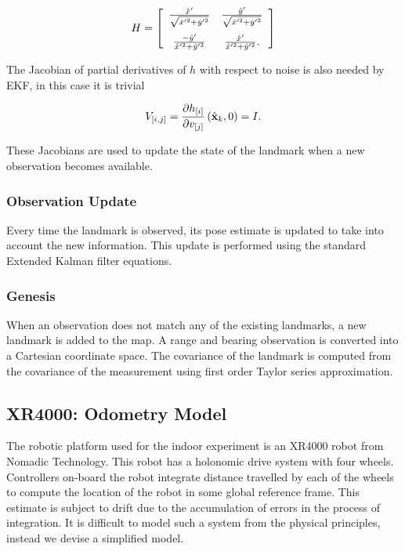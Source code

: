 $$
H = 
 \left[ \begin {array}{cc}
   \frac{\hat{x}'}{ \sqrt{\hat{x}'^2+\hat{y}'^2} } & 
   \frac{\hat{y}'}{ \sqrt{\hat{x}'^2+\hat{y}'^2} } \\ \noalign{\medskip}
   \frac{-\hat{y}'}{ \hat{x}'^2+\hat{y}'^2 } & 
   \frac{ \hat{x}'}{ \hat{x}'^2+\hat{y}'^2 }.
\end{array} \right] 
$$

The Jacobian of partial derivatives of $h$ with respect
to noise is also needed by EKF, in this case it is trivial

$$
V_{[i,j]} = \frac{\partial h_{[i]}}{\partial v_{[j]}}
             \left(\hat{\bf x}_k , 0 \right) = I.
$$

These Jacobians are used to update the state of the landmark when a
new observation becomes available.


\subsubsection{Observation Update}

Every time the landmark is observed, its pose estimate is updated to
take into account the new information. This update is performed using
the standard Extended Kalman filter equations.


\subsubsection{Genesis}

When an observation does not match any of the existing landmarks, a
new landmark is added to the map. A range and bearing observation is
converted into a Cartesian coordinate space. The covariance of the
landmark is computed from the covariance of the measurement using
first order Taylor series approximation.


\subsection{XR4000: Odometry Model}

The robotic platform used for the indoor experiment is an XR4000 robot
from Nomadic Technology. This robot has a holonomic drive system with
four wheels. Controllers on-board the robot integrate distance
travelled by each of the wheels to compute the location of the robot
in some global reference frame. This estimate is subject to drift
due to the accumulation of errors in the process of integration. It is
difficult to model such a system from the physical principles, instead
we devise a simplified model.

